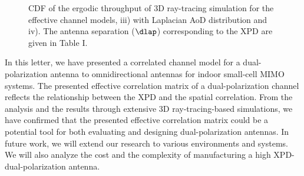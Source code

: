 \documentclass[journal]{IEEEtran}
\begin{document}
\begin{figure}[!t]
\caption{CDF of the ergodic throughput of 3D ray-tracing simulation for the effective channel models, iii) with Laplacian AoD distribution and iv). The antenna separation ($\dlap$) corresponding to the XPD are given in Table I.}
\label{result_SCM}
\end{figure}
In this letter, we have presented a correlated channel model for a dual-polarization antenna to omnidirectional antennas for indoor small-cell MIMO systems. The presented effective correlation matrix of a dual-polarization channel reflects the relationship between the XPD and the spatial correlation. From the analysis and the results through extensive 3D ray-tracing-based simulations, we have confirmed that the presented effective correlation matrix could be a potential tool for both evaluating and designing dual-polarization antennas. In future work, we will extend our research to various environments and systems. We will also analyze the cost and the complexity of manufacturing a high XPD-dual-polarization antenna.



\end{document}
